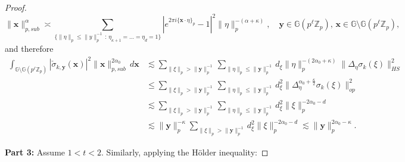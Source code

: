 \documentclass[12pt, reqno]{amsart}
\newcommand{\Z}{\mathbb{Z}}
\newcommand{\1}{\mathds{1}}
\newcommand{\G}{\mathbb{G}}
\begin{document}
\begin{proof}
$$\| \mathbf{x} \|_{p,sub}^\alpha \asymp \sum_{\{ \| \eta \|_p \leq \| y \|_p^{-1}  \, : \, \eta_{\kappa+1} = ...= \eta_d = 1 \}} |e^{2 \pi i \{ \mathbf{x} \cdot \eta \}_p}-1|^2 \| \eta \|_p^{-(\alpha + \kappa)},\quad \mathbf{y} \in  \G(p^\ell \Z_p), \, \mathbf{x} \in \G \setminus  \G(p^\ell \Z_p),$$
and therefore 
\begin{align*}    
\int_{\G \setminus \G(p^\ell \mathbb{Z}_p)}
|\check{\sigma}_{k,\mathbf{y}}(\mathbf{x})|^2
\|\mathbf{x}\|_{p, sub}^{2 \alpha_0}
\,d\mathbf{x}
&\lesssim
\sum_{\|\xi\|_p > \|\mathbf{y}\|_p^{-1}}
\sum_{\|\eta\|_p \le \|\mathbf{y}\|_p^{-1}}
d_\xi  
\|\eta\|_p^{-(2\alpha_0+\kappa)}
\|\Delta_\eta\sigma_k(\xi)\|_{HS}^2
\\&\leq  \sum_{\|\xi\|_p > \|\mathbf{y}\|_p^{-1}}
\sum_{\|\eta\|_p \le \|\mathbf{y}\|_p^{-1}}
d_\xi^2 
\|\Delta_\eta^{\alpha_0 + \frac{\kappa}{2}}\sigma_k(\xi)\|_{op}^2 \\ & \lesssim \sum_{\|\xi\|_p > \|\mathbf{y}\|_p^{-1}}
\sum_{\|\eta\|_p \le \|\mathbf{y}\|_p^{-1}}
d_\xi^2  
\|\xi \|_p^{-2\alpha_0 -d} \\ &\lesssim \|\mathbf{y}\|_p^{-\kappa} \sum_{\|\xi\|_p > \|\mathbf{y}\|_p^{-1}} d_\xi^2  
\|\xi \|_p^{-2\alpha_0 -d}  \lesssim \|\mathbf{y}\|_p^{2 \alpha_0 -\kappa} .
\end{align*}

\textbf{Part 3:} Assume $1<t<2$. Similarly, applying the H{\"o}lder inequality:


\end{proof}
\end{document}
